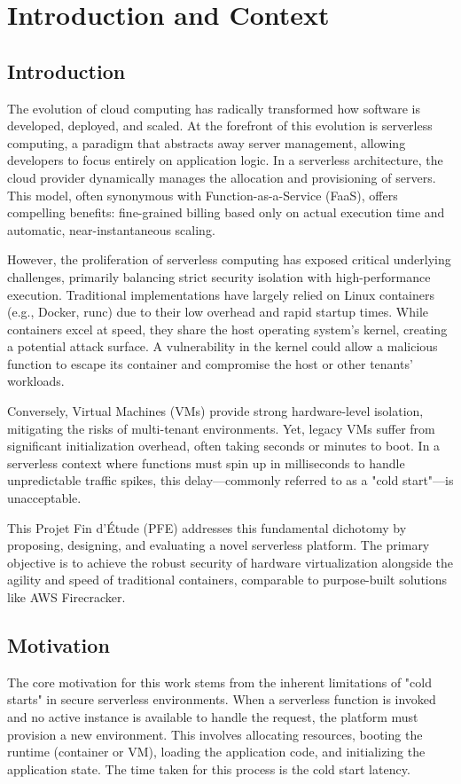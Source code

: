 \documentclass[12pt,a4paper]{report}
\begin{document}
\tableofcontents
\listoffigures
\listoftables

\clearpage{}\chapter{Introduction and Context}

\section{Introduction}
The evolution of cloud computing has radically transformed how software is developed, deployed, and scaled. At the forefront of this evolution is serverless computing, a paradigm that abstracts away server management, allowing developers to focus entirely on application logic. In a serverless architecture, the cloud provider dynamically manages the allocation and provisioning of servers. This model, often synonymous with Function-as-a-Service (FaaS), offers compelling benefits: fine-grained billing based only on actual execution time and automatic, near-instantaneous scaling.

However, the proliferation of serverless computing has exposed critical underlying challenges, primarily balancing strict security isolation with high-performance execution. Traditional implementations have largely relied on Linux containers (e.g., Docker, runc) due to their low overhead and rapid startup times. While containers excel at speed, they share the host operating system's kernel, creating a potential attack surface. A vulnerability in the kernel could allow a malicious function to escape its container and compromise the host or other tenants' workloads.

Conversely, Virtual Machines (VMs) provide strong hardware-level isolation, mitigating the risks of multi-tenant environments. Yet, legacy VMs suffer from significant initialization overhead, often taking seconds or minutes to boot. In a serverless context where functions must spin up in milliseconds to handle unpredictable traffic spikes, this delay---commonly referred to as a "cold start"---is unacceptable.

This Projet Fin d'\'Etude (PFE) addresses this fundamental dichotomy by proposing, designing, and evaluating a novel serverless platform. The primary objective is to achieve the robust security of hardware virtualization alongside the agility and speed of traditional containers, comparable to purpose-built solutions like AWS Firecracker.

\section{Motivation}
The core motivation for this work stems from the inherent limitations of "cold starts" in secure serverless environments. When a serverless function is invoked and no active instance is available to handle the request, the platform must provision a new environment. This involves allocating resources, booting the runtime (container or VM), loading the application code, and initializing the application state. The time taken for this process is the cold start latency.
\end{document}
